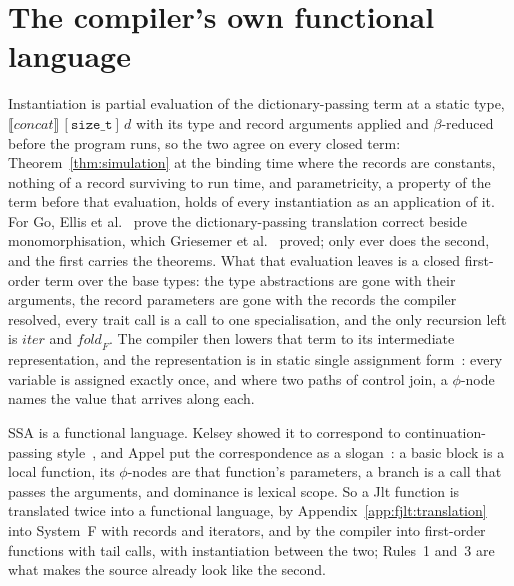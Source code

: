 \section{The compiler's own functional language}
\label{app:fjlt:ssa}

Instantiation is partial evaluation of the dictionary-passing term at a static type, $\llbracket \mathit{concat} \rrbracket\,[\mathtt{size\_t}]\,d$ with its type and record arguments applied and $\beta$-reduced before the program runs, so the two agree on every closed term: Theorem~\ref{thm:simulation} at the binding time where the records are constants, nothing of a record surviving to run time, and parametricity, a property of the term before that evaluation, holds of every instantiation as an application of it.
For Go, Ellis et al.~\cite{ellis2022generic} prove the dictionary-passing translation correct beside monomorphisation, which Griesemer et al.~\cite{griesemer2020featherweight} proved; \Cpp{} only ever does the second, and the first carries the theorems.
What that evaluation leaves is a closed first-order term over the base types: the type abstractions are gone with their arguments, the record parameters are gone with the records the compiler resolved, every trait call is a call to one specialisation, and the only recursion left is $\mathit{iter}$ and $\mathit{fold}_F$.
The compiler then lowers that term to its intermediate representation, and the representation is in static single assignment form~\cite{cytron1991ssa}: every variable is assigned exactly once, and where two paths of control join, a $\phi$-node names the value that arrives along each.

SSA is a functional language.
Kelsey showed it to correspond to continuation-passing style~\cite{kelsey1995correspondence}, and Appel put the correspondence as a slogan~\cite{appel1998ssa}: a basic block is a local function, its $\phi$-nodes are that function's parameters, a branch is a call that passes the arguments, and dominance is lexical scope.
So a Jlt function is translated twice into a functional language, by Appendix~\ref{app:fjlt:translation} into System~F with records and iterators, and by the compiler into first-order functions with tail calls, with instantiation between the two; Rules~1 and~3 are what makes the source already look like the second.

